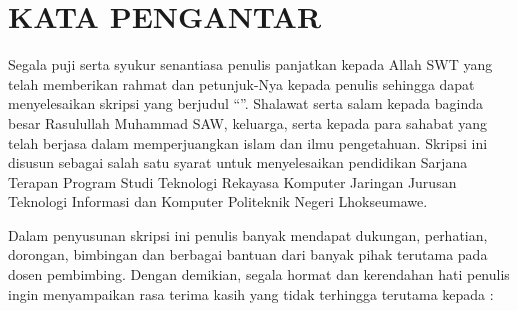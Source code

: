 \chapter*{KATA PENGANTAR}
\noindent

Segala puji serta syukur senantiasa penulis panjatkan kepada Allah SWT 
yang telah memberikan rahmat dan petunjuk-Nya kepada penulis sehingga dapat 
menyelesaikan skripsi yang berjudul “\judulId”. Shalawat serta salam kepada baginda besar Rasulullah 
Muhammad SAW, keluarga, serta kepada para sahabat yang telah berjasa dalam 
memperjuangkan islam dan ilmu pengetahuan. Skripsi ini disusun sebagai salah 
satu syarat untuk menyelesaikan pendidikan Sarjana Terapan Program Studi 
Teknologi Rekayasa Komputer Jaringan Jurusan Teknologi Informasi dan 
Komputer Politeknik Negeri Lhokseumawe.

Dalam penyusunan skripsi ini penulis banyak mendapat dukungan, perhatian, 
dorongan, bimbingan dan berbagai bantuan dari banyak pihak terutama pada
dosen pembimbing. Dengan demikian, segala hormat dan kerendahan hati penulis 
ingin menyampaikan rasa terima kasih yang tidak terhingga terutama kepada :

